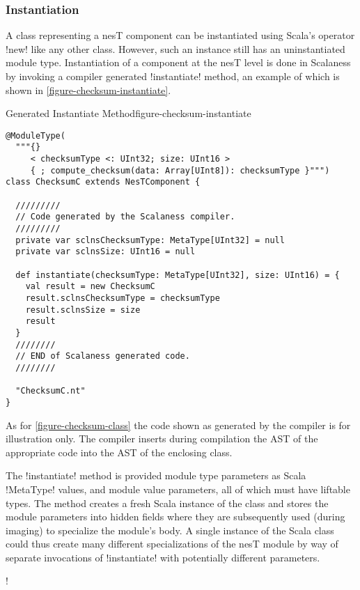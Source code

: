 \subsubsection{Instantiation}
\label{section-instantiation}

A class representing a nesT component can be instantiated using Scala's operator !new! like any
other class. However, such an instance still has an uninstantiated module type. Instantiation of
a component at the nesT level is done in Scalaness by invoking a compiler generated
!instantiate! method, an example of which is shown in \autoref{figure-checksum-instantiate}.

\singlespace
\begin{fpfig}[tbhp]{Generated Instantiate Method}{figure-checksum-instantiate}
{
\begin{lstlisting}[language=scalaness]
@ModuleType(
  """{}
     < checksumType <: UInt32; size: UInt16 >
     { ; compute_checksum(data: Array[UInt8]): checksumType }""")
class ChecksumC extends NesTComponent {

  /////////
  // Code generated by the Scalaness compiler.
  /////////
  private var sclnsChecksumType: MetaType[UInt32] = null
  private var sclnsSize: UInt16 = null

  def instantiate(checksumType: MetaType[UInt32], size: UInt16) = {
    val result = new ChecksumC
    result.sclnsChecksumType = checksumType
    result.sclnsSize = size
    result
  }
  ////////
  // END of Scalaness generated code.
  //////// 
           
  "ChecksumC.nt"
}
\end{lstlisting}
}
\end{fpfig}
\primaryspacing

As for \autoref{figure-checksum-class} the code shown as generated by the compiler is for
illustration only. The compiler inserts during compilation the AST of the appropriate code into
the AST of the enclosing class.

The !instantiate! method is provided module type parameters as Scala !MetaType! values, and
module value parameters, all of which must have liftable types. The method creates a fresh Scala
instance of the class and stores the module parameters into hidden fields where they are
subsequently used (during imaging) to specialize the module's body. A single instance of the
Scala class could thus create many different specializations of the nesT module by way of
separate invocations of !instantiate! with potentially different parameters.

\lstDeleteShortInline!

